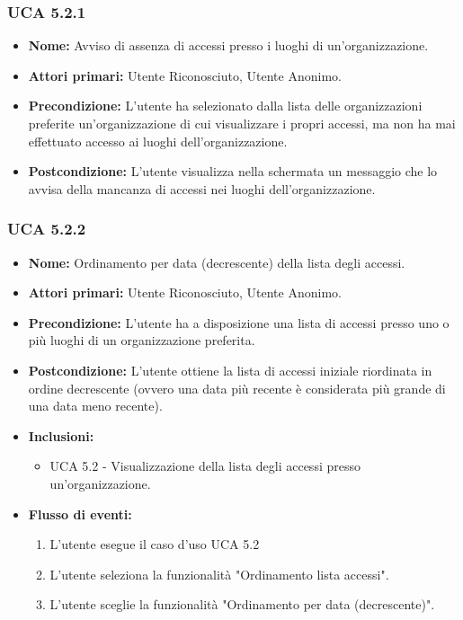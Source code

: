 \subsubsection{UCA 5.2.1}
\begin{itemize}
    \item \textbf{Nome:} Avviso di assenza di accessi presso i luoghi di un’organizzazione.
    \item \textbf{Attori primari:} Utente Riconosciuto, Utente Anonimo.
    \item \textbf{Precondizione:} L'utente ha selezionato dalla lista delle organizzazioni preferite un'organizzazione di cui visualizzare i propri accessi, ma non ha mai effettuato accesso ai luoghi dell'organizzazione.
    \item \textbf{Postcondizione:} L'utente visualizza nella schermata un messaggio che lo avvisa della mancanza di accessi nei luoghi dell'organizzazione.
\end{itemize}

\subsubsection{UCA 5.2.2}
\begin{itemize}
    \item \textbf{Nome:} Ordinamento per data (decrescente) della lista degli accessi.
    \item \textbf{Attori primari:} Utente Riconosciuto, Utente Anonimo.
    \item \textbf{Precondizione:} L’utente ha a disposizione una lista di accessi presso uno o più luoghi di un organizzazione preferita.
    \item \textbf{Postcondizione:} L’utente ottiene la lista di accessi iniziale riordinata in ordine decrescente (ovvero una data più recente è considerata più grande di una data meno recente).
    \item \textbf{Inclusioni:} %
    \begin{itemize}
        \item UCA 5.2 - Visualizzazione della lista degli accessi presso un'organizzazione.
    \end{itemize}
    \item \textbf{Flusso di eventi:}
    \begin{enumerate}
        \item L'utente esegue il caso d'uso UCA 5.2
        \item L'utente seleziona la funzionalità "Ordinamento lista accessi".
        \item L'utente sceglie la funzionalità "Ordinamento per data (decrescente)".
    \end{enumerate}
\end{itemize}


